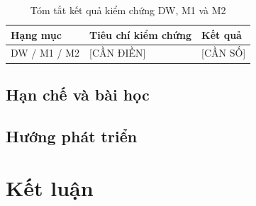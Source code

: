 \documentclass[a4paper]{article}
\begin{document}
\begin{table}[htbp]
\centering
\caption{Tóm tắt kết quả kiểm chứng DW, M1 và M2}
\label{tab:eval_summary}
\begin{tabular}{lp{6.0cm}l}
\toprule
\textbf{Hạng mục} & \textbf{Tiêu chí kiểm chứng} & \textbf{Kết quả} \\
\midrule
DW / M1 / M2 & [CẦN ĐIỀN] & [CẦN SỐ] \\
\bottomrule
\end{tabular}
\end{table}

\subsection{Hạn chế và bài học}
\label{subsec:6_3}

\subsection{Hướng phát triển}
\label{subsec:6_4}

\section{Kết luận}
\label{sec:ch7}
\end{document}
